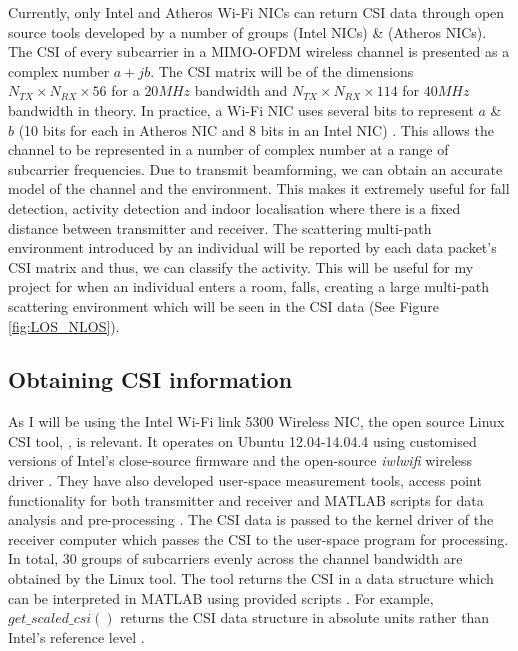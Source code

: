 Currently, only Intel and Atheros Wi-Fi NICs can return CSI data through open source tools developed by a number of groups \cite{Halperin_csitool} (Intel NICs) \& \cite{Xie:2015:PPD:2789168.2790124} (Atheros NICs). The CSI of every subcarrier in a MIMO-OFDM wireless channel is presented as a complex number $a+jb$. The CSI matrix will be of the dimensions $N_{TX}\times N_{RX}\times 56$ for a $20MHz$ bandwidth and $N_{TX}\times N_{RX}\times 114$ for $40MHz$ bandwidth in theory. In practice, a Wi-Fi NIC uses several bits to represent $a$ \& $b$ (10 bits for each in Atheros NIC and 8 bits in an Intel NIC) \citep{Xie:2015:PPD:2789168.2790124}. This allows the channel to be represented in a number of complex number at a range of subcarrier frequencies. Due to transmit beamforming, we can obtain an accurate model of the channel and the environment. This makes it extremely useful for fall detection, activity detection and indoor localisation where there is a fixed distance between transmitter and receiver. The scattering multi-path environment introduced by an individual will be reported by each data packet's CSI matrix and thus, we can classify the activity. This will be useful for my project for when an individual enters a room, falls, creating a large multi-path scattering environment which will be seen in the CSI data (See Figure \ref{fig:LOS_NLOS}).
\subsection{Obtaining CSI information}
As I will be using the Intel Wi-Fi link 5300 Wireless NIC, the open source Linux CSI tool, \cite{Halperin_csitool}, is relevant. It operates on Ubuntu 12.04-14.04.4 using customised versions of Intel's close-source firmware and the open-source \textit{iwlwifi} wireless driver \citep{Halperin_csitool}. 
They have also developed user-space measurement tools, access point functionality for both transmitter and receiver and MATLAB scripts for data analysis and pre-processing \citep{Halperin_csitool}. 
The CSI data is passed to the kernel driver of the receiver computer which passes the CSI to the user-space program for processing.
In total, 30 groups of subcarriers evenly across the channel bandwidth are obtained by the Linux tool. The tool returns the CSI in a data structure which can be interpreted in MATLAB using provided scripts \citep{Halperin_csitool}.
For example, $get\_scaled\_csi()$ returns the CSI data structure in absolute units rather than Intel's reference level \citep{Halperin_csitool}. 
